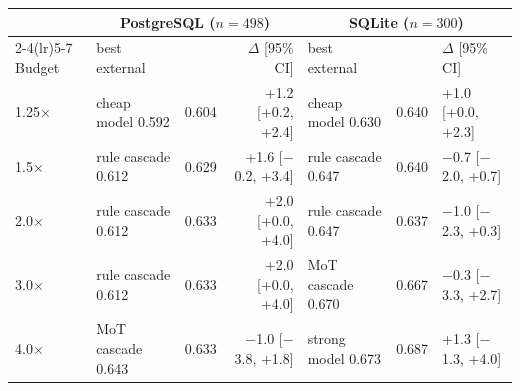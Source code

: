\begin{tabular}{@{}lllrlll@{}}
\toprule
 & \multicolumn{3}{c}{PostgreSQL ($n{=}498$)} & \multicolumn{3}{c}{SQLite ($n{=}300$)} \\
\cmidrule(lr){2-4}\cmidrule(lr){5-7}
Budget & best external & \sys{} & $\Delta$ [95\% CI] & best external & \sys{} & $\Delta$ [95\% CI] \\
\midrule
1.25$\times$ & cheap model 0.592 & 0.604 & +1.2 [+0.2, +2.4] & cheap model 0.630 & 0.640 & +1.0 [+0.0, +2.3] \\
1.5$\times$ & rule cascade 0.612 & 0.629 & +1.6 [$-$0.2, +3.4] & rule cascade 0.647 & 0.640 & $-$0.7 [$-$2.0, +0.7] \\
2.0$\times$ & rule cascade 0.612 & 0.633 & +2.0 [+0.0, +4.0] & rule cascade 0.647 & 0.637 & $-$1.0 [$-$2.3, +0.3] \\
3.0$\times$ & rule cascade 0.612 & 0.633 & +2.0 [+0.0, +4.0] & MoT cascade 0.670 & 0.667 & $-$0.3 [$-$3.3, +2.7] \\
4.0$\times$ & MoT cascade 0.643 & 0.633 & $-$1.0 [$-$3.8, +1.8] & strong model 0.673 & 0.687 & +1.3 [$-$1.3, +4.0] \\
\bottomrule
\end{tabular}